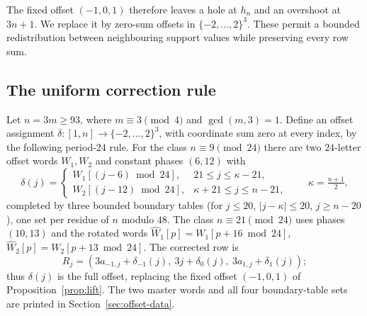The fixed offset $(-1,0,1)$ therefore leaves a hole at $h_n$ and an overshoot at $3n+1$.
We replace it by zero-sum offsets in $\{-2,\dots,2\}^3$. These permit a bounded redistribution
between neighbouring support values while preserving every row sum.

\subsection{The uniform correction rule}\label{sec:rule}

\begin{definition}\label{def:rule}
Let $n=3m\ge93$, where $m\equiv3\pmod4$ and $\gcd(m,3)=1$. Define an offset assignment
$\delta:[1,n]\to\{-2,\dots,2\}^3$, with coordinate sum zero at every index, by the following
period-$24$ rule. For the class
$n\equiv9\pmod{24}$ there are two $24$-letter offset words $W_1,W_2$ and constant phases $(6,12)$ with
\[
\delta(j)=
\begin{cases}
W_1[(j-6)\bmod24], & 21\le j\le\kappa-21,\\
W_2[(j-12)\bmod24], & \kappa+21\le j\le n-21,
\end{cases}\qquad \kappa=\tfrac{n+1}2,
\]
completed by three bounded boundary tables (for $j\le20$, $|j-\kappa|\le20$, $j\ge n-20$), one set per
residue of $n$ modulo $48$.  The class $n\equiv21\pmod{24}$ uses phases $(10,13)$ and the rotated
words $\widehat W_1[p]=W_1[p+16\bmod24]$, $\widehat W_2[p]=W_2[p+13\bmod24]$.
The corrected row is
\[
 R_j=(3a_{-1,j}+\delta_{-1}(j),\ 3j+\delta_0(j),\ 3a_{1,j}+\delta_1(j));
\]
thus $\delta(j)$ is the full offset, replacing the fixed offset $(-1,0,1)$ of
Proposition~\ref{prop:lift}.
The two master words and all four boundary-table sets are printed in
Section~\ref{sec:offset-data}.
\end{definition}

